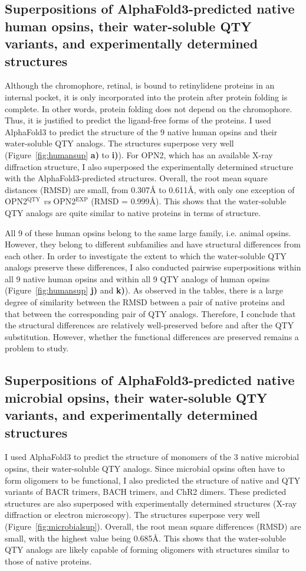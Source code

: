 \documentclass[fleqn, 10pt]{manuscript}
\begin{document}
\subsection*{Superpositions of AlphaFold3-predicted native human opsins, their water-soluble QTY variants, and experimentally determined structures}

Although the chromophore, retinal, is bound to retinylidene proteins in an internal pocket, it is only incorporated into the protein after protein folding is complete. In other words, protein folding does not depend on the chromophore. Thus, it is justified to predict the ligand-free forms of the proteins. I used AlphaFold3 to predict the structure of the 9 native human opsins and their water-soluble QTY analogs. The structures superpose very well (Figure~\ref{fig:humansup} \textbf{a)} to \textbf{i)}). For OPN2, which has an available X-ray diffraction structure, I also superposed the experimentally determined structure with the AlphaFold3-predicted structures. Overall, the root mean square distances (RMSD) are small, from 0.307{\AA} to 0.611\AA, with only one exception of OPN2$^{\textrm{QTY}}$ \textit{vs} OPN2$^{\textrm{EXP}}$ (RMSD = 0.999\AA). This shows that the water-soluble QTY analogs are quite similar to native proteins in terms of structure. 

All 9 of these human opsins belong to the same large family, i.e. animal opsins. However, they belong to different subfamilies and have structural differences from each other. In order to investigate the extent to which the water-soluble QTY analogs preserve these differences, I also conducted pairwise superpositions within all 9 native human opsins and within all 9 QTY analogs of human opsins (Figure~\ref{fig:humansup} \textbf{j)} and \textbf{k)}). As observed in the tables, there is a large degree of similarity between the RMSD between a pair of native proteins and that between the corresponding pair of QTY analogs. Therefore, I conclude that the structural differences are relatively well-preserved before and after the QTY substitution. However, whether the functional differences are preserved remains a problem to study. 

\subsection*{Superpositions of AlphaFold3-predicted native microbial opsins, their water-soluble QTY variants, and experimentally determined structures}

I used AlphaFold3 to predict the structure of monomers of the 3 native microbial opsins, their water-soluble QTY analogs. Since microbial opsins often have to form oligomers to be functional, I also predicted the structure of native and QTY variants of BACR trimers, BACH trimers, and ChR2 dimers. These predicted structures are also superposed with experimentally determined structures (X-ray diffraction or electron microscopy). The structures superpose very well (Figure~\ref{fig:microbialsup}). Overall, the root mean square differences (RMSD) are small, with the highest value being 0.685\AA. This shows that the water-soluble QTY analogs are likely capable of forming oligomers with structures similar to those of native proteins. 
\end{document}
